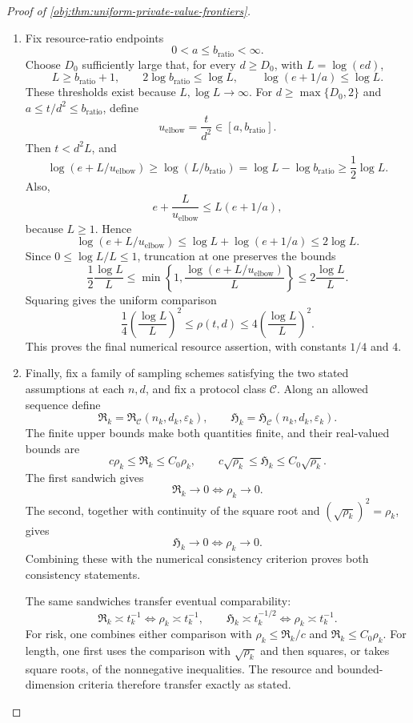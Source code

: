 \documentclass[11pt]{article}
\begin{document}
\begin{proof}[Proof of \cref{obj:thm:uniform-private-value-frontiers}]
\begin{enumerate}
\item
Fix resource-ratio endpoints
\[
0<a\le b_{\mathrm{ratio}}<\infty.
\]
Choose \(D_0\) sufficiently large that, for every \(d\ge D_0\), with \(L=\log(ed)\),
\[
L\ge b_{\mathrm{ratio}}+1,\qquad
2\log b_{\mathrm{ratio}}\le\log L,\qquad
\log(e+1/a)\le\log L.
\]
These thresholds exist because \(L,\log L\to\infty\).
For \(d\ge\max\{D_0,2\}\) and \(a\le t/d^2\le b_{\mathrm{ratio}}\), define
\[
u_{\mathrm{elbow}}=\frac{t}{d^2}\in[a,b_{\mathrm{ratio}}].
\]
Then \(t<d^2L\), and
\[
\log(e+L/u_{\mathrm{elbow}})
\ge\log(L/b_{\mathrm{ratio}})
=\log L-\log b_{\mathrm{ratio}}\ge\frac12\log L.
\]
Also,
\[
e+\frac{L}{u_{\mathrm{elbow}}}
\le L(e+1/a),
\]
because \(L\ge1\). Hence
\[
\log(e+L/u_{\mathrm{elbow}})
\le\log L+\log(e+1/a)\le2\log L.
\]
Since \(0\le\log L/L\le1\), truncation at one preserves the bounds
\[
\frac12\frac{\log L}{L}
\le\min\left\{1,\frac{\log(e+L/u_{\mathrm{elbow}})}L\right\}
\le2\frac{\log L}{L}.
\]
Squaring gives the uniform comparison
\[
\frac14\left(\frac{\log L}{L}\right)^2
\le\rho(t,d)\le
4\left(\frac{\log L}{L}\right)^2.
\]
This proves the final numerical resource assertion, with constants \(1/4\) and \(4\).

\item
Finally, fix a family of sampling schemes satisfying the two stated assumptions at each \(n,d\), and fix a protocol class \(\mathcal C\).
Along an allowed sequence define
\[
\mathfrak R_k=\mathfrak R_{\mathcal C}(n_k,d_k,\varepsilon_k),
\qquad
\mathfrak H_k=\mathfrak H_{\mathcal C}(n_k,d_k,\varepsilon_k).
\]
The finite upper bounds make both quantities finite, and their real-valued bounds are
\[
c\rho_k\le\mathfrak R_k\le C_0\rho_k,
\qquad
c\sqrt{\rho_k}\le\mathfrak H_k\le C_0\sqrt{\rho_k}.
\]
The first sandwich gives
\[
\mathfrak R_k\to0\iff\rho_k\to0.
\]
The second, together with continuity of the square root and
\((\sqrt{\rho_k})^2=\rho_k\), gives
\[
\mathfrak H_k\to0\iff\rho_k\to0.
\]
Combining these with the numerical consistency criterion proves both consistency statements.

The same sandwiches transfer eventual comparability:
\[
\mathfrak R_k\asymp t_k^{-1}
\iff\rho_k\asymp t_k^{-1},
\qquad
\mathfrak H_k\asymp t_k^{-1/2}
\iff\rho_k\asymp t_k^{-1}.
\]
For risk, one combines either comparison with
\(\rho_k\le\mathfrak R_k/c\) and
\(\mathfrak R_k\le C_0\rho_k\).
For length, one first uses the comparison with \(\sqrt{\rho_k}\) and then squares, or takes square roots, of the nonnegative inequalities. The resource and bounded-dimension criteria therefore transfer exactly as stated.


\end{enumerate}
\end{proof}
\end{document}
